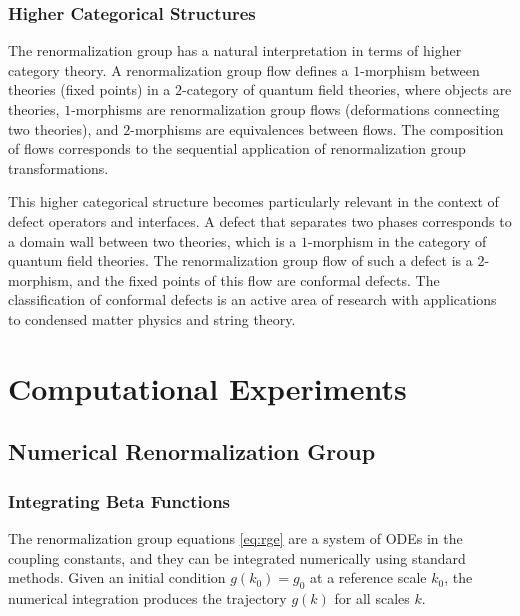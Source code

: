 \documentclass[11pt, twoside, openright]{book}
\theoremstyle{dotted}
\theoremstyle{definition}
\begin{document}
\section{Higher Categorical Structures}

The renormalization group has a natural interpretation in terms of higher category
theory. A renormalization group flow defines a $1$-morphism between theories (fixed
points) in a $2$-category of quantum field theories, where objects are theories,
$1$-morphisms are renormalization group flows (deformations connecting two theories),
and $2$-morphisms are equivalences between flows. The composition of flows corresponds
to the sequential application of renormalization group transformations.

This higher categorical structure becomes particularly relevant in the context of
defect operators and interfaces. A defect that separates two phases corresponds to
a domain wall between two theories, which is a $1$-morphism in the category of
quantum field theories. The renormalization group flow of such a defect is a
$2$-morphism, and the fixed points of this flow are conformal defects. The
classification of conformal defects is an active area of research with applications
to condensed matter physics and string theory.

\part{Computational Experiments}

\chapter{Numerical Renormalization Group}
\label{ch:numerical_rg}

\section{Integrating Beta Functions}

The renormalization group equations \eqref{eq:rge} are a system of ODEs in the
coupling constants, and they can be integrated numerically using standard
methods. Given an initial condition $g(k_0) = g_0$ at a reference scale $k_0$,
the numerical integration produces the trajectory $g(k)$ for all scales $k$.
\end{document}
